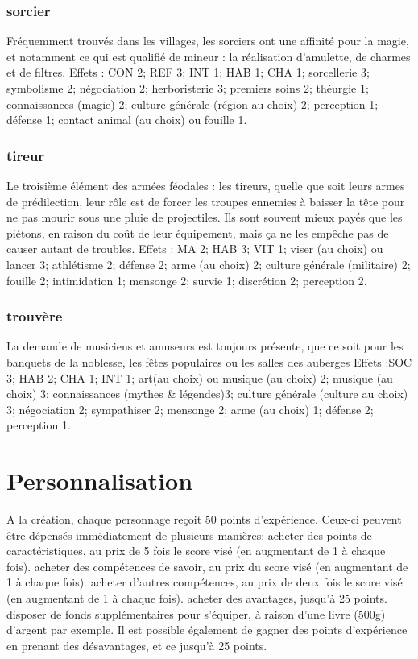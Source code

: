 \documentclass[10pt,a4paper,twocolumn]{book}
\begin{document}
\subsection*{sorcier}
Fréquemment trouvés dans les villages, les sorciers ont une affinité pour la magie, et notamment ce qui est qualifié de mineur : la réalisation d’amulette, de charmes et de filtres.
Effets : CON 2; REF 3; INT 1; HAB 1; CHA 1; sorcellerie 3; symbolisme 2; négociation 2; herboristerie 3; premiers soins 2; théurgie 1; connaissances (magie) 2; culture générale (région au choix) 2; perception 1; défense 1; contact animal (au choix) ou fouille 1.
\subsection*{tireur}
Le troisième élément des armées féodales : les tireurs, quelle que soit leurs armes de prédilection, leur rôle est de forcer les troupes ennemies à baisser la tête pour ne pas mourir sous une pluie de projectiles. Ils sont souvent mieux payés que les piétons, en raison du coût de leur équipement, mais ça ne les empêche pas de causer autant de troubles.
Effets : MA 2; HAB 3; VIT 1; viser (au choix) ou lancer 3; athlétisme 2; défense 2; arme (au choix) 2; culture générale (militaire) 2; fouille 2; intimidation 1; mensonge 2; survie 1; discrétion 2; perception 2.
\subsection*{trouvère}
La demande de musiciens et amuseurs est toujours présente, que ce soit pour les banquets de la noblesse, les fêtes populaires ou les salles des auberges
Effets :SOC 3; HAB 2; CHA 1; INT 1; art(au choix) ou musique (au choix) 2; musique (au choix) 3; connaissances (mythes \& légendes)3; culture générale (culture au choix) 3; négociation 2; sympathiser 2; mensonge 2; arme (au choix) 1; défense 2; perception 1.

\chapter{Personnalisation}
A la création, chaque personnage reçoit 50 points d’expérience. Ceux-ci peuvent être dépensés immédiatement de plusieurs manières:
acheter des points de caractéristiques, au prix de 5 fois le score visé (en augmentant de 1 à chaque fois).
acheter des compétences de savoir, au prix du score visé (en augmentant de 1 à chaque fois).
acheter d’autres compétences, au prix de deux fois le score visé (en augmentant de 1 à chaque fois).
acheter des avantages, jusqu’à 25 points.
disposer de fonds supplémentaires pour s’équiper, à raison d’une livre (500g) d’argent par exemple.
Il est possible également de gagner des points d’expérience en prenant des désavantages, et ce jusqu’à 25 points.
\end{document}
